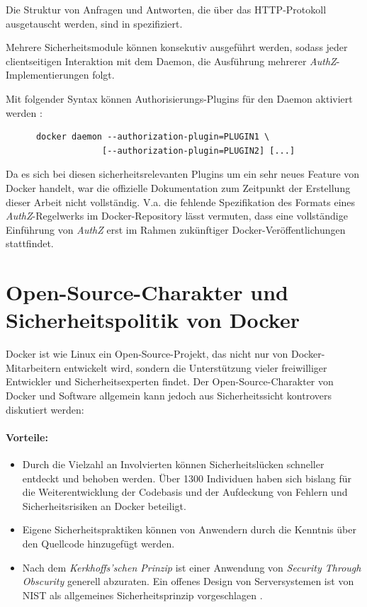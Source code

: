 \documentclass[../main.tex]{subfiles}
\begin{document}
    Die Struktur von Anfragen und Antworten, die über das HTTP-Protokoll ausgetauscht werden, sind in \cite{githubAuthZExtended} spezifiziert.

    Mehrere Sicherheitsmodule können konsekutiv ausgeführt werden, sodass jeder clientseitigen Interaktion mit dem Daemon, die Ausführung mehrerer \emph{AuthZ}-Implementierungen folgt.

    Mit folgender Syntax können Authorisierungs-Plugins für den Daemon aktiviert werden \cite{githubAuthZExtended}:

    \begin{lstlisting}
      docker daemon --authorization-plugin=PLUGIN1 \
                   [--authorization-plugin=PLUGIN2] [...]
    \end{lstlisting}

    Da es sich bei diesen sicherheitsrelevanten Plugins um ein sehr neues Feature von Docker handelt, war die offizielle Dokumentation zum Zeitpunkt der Erstellung dieser Arbeit nicht vollständig. V.a. die fehlende Spezifikation des Formats eines \emph{AuthZ}-Regelwerks im Docker-Repository lässt vermuten, dass eine vollständige Einführung von \emph{AuthZ} erst im Rahmen zukünftiger Docker-Veröffentlichungen stattfindet.

  \section{Open-Source-Charakter und Sicherheitspolitik von Docker}
  \label{opensource}
    Docker ist wie Linux ein Open-Source-Projekt, das nicht nur von Docker-Mitarbeitern entwickelt wird, sondern die Unterstützung vieler freiwilliger Entwickler und Sicherheitsexperten findet. Der Open-Source-Charakter von Docker und Software allgemein kann jedoch aus Sicherheitssicht kontrovers diskutiert werden:

    \paragraph{Vorteile:}
    \begin{itemize}
      \item Durch die Vielzahl an Involvierten können Sicherheitslücken schneller entdeckt und behoben werden. Über 1300 Individuen haben sich bislang für die Weiterentwicklung der Codebasis und der Aufdeckung von Fehlern und Sicherheitsrisiken an Docker beteiligt.
      \item Eigene Sicherheitspraktiken können von Anwendern durch die Kenntnis über den Quellcode hinzugefügt werden.
      \item Nach dem \emph{Kerkhoffs'schen Prinzip} ist einer Anwendung von \emph{Security Through Obscurity} generell abzuraten. Ein offenes Design von Serversystemen ist von NIST als allgemeines Sicherheitsprinzip vorgeschlagen \cite[S.15]{nist}.
    \end{itemize}
\end{document}
